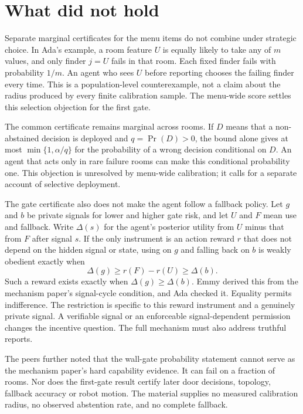 \documentclass{article}
\begin{document}
\section{What did not hold}

Separate marginal certificates for the menu items do not combine under strategic choice. In Ada's
example, a room feature \(U\) is equally likely to take any of \(m\) values, and only finder \(j=U\)
fails in that room. Each fixed finder fails with probability \(1/m\). An agent who sees \(U\) before
reporting chooses the failing finder every time. This is a population-level counterexample, not a
claim about the radius produced by every finite calibration sample. The menu-wide score settles this
selection objection for the first gate.

The common certificate remains marginal across rooms. If \(D\) means that a non-abstained decision
is deployed and \(q=\Pr(D)>0\), the bound alone gives at most \(\min\{1,\alpha/q\}\) for the
probability of a wrong decision conditional on \(D\). An agent that acts only in rare failure rooms
can make this conditional probability one. This objection is unresolved by menu-wide calibration; it
calls for a separate account of selective deployment.

The gate certificate also does not make the agent follow a fallback policy. Let \(g\) and \(b\) be
private signals for lower and higher gate risk, and let \(U\) and \(F\) mean use and fallback. Write
\(\Delta(s)\) for the agent's posterior utility from \(U\) minus that from \(F\) after signal \(s\).
If the only instrument is an action reward \(r\) that does not depend on the hidden signal or state,
using on \(g\) and falling back on \(b\) is weakly obedient exactly when
\[
\Delta(g)\geq r(F)-r(U)\geq\Delta(b).
\]
Such a reward exists exactly when \(\Delta(g)\geq\Delta(b)\). Emmy derived this from the mechanism
paper's signal-cycle condition, and Ada checked it. Equality permits indifference. The restriction
is specific to this reward instrument and a genuinely private signal. A verifiable signal or an
enforceable signal-dependent permission changes the incentive question. The full mechanism must also
address truthful reports.

The peers further noted that the wall-gate probability statement cannot serve as the mechanism
paper's hard capability evidence. It can fail on a fraction of rooms. Nor does the first-gate result
certify later door decisions, topology, fallback accuracy or robot motion. The material supplies no
measured calibration radius, no observed abstention rate, and no complete fallback.
\end{document}
